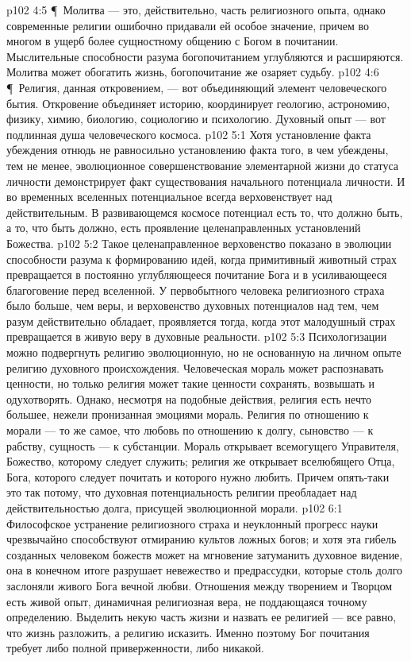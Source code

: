 \vs p102 4:5 \P\ Молитва --- это, действительно, часть религиозного опыта, однако современные религии ошибочно придавали ей особое значение, причем во многом в ущерб более сущностному общению с Богом в почитании. Мыслительные способности разума богопочитанием углубляются и расширяются. Молитва может обогатить жизнь, богопочитание же озаряет судьбу.
\vs p102 4:6 \P\ Религия, данная откровением, --- вот объединяющий элемент человеческого бытия. Откровение объединяет историю, координирует геологию, астрономию, физику, химию, биологию, социологию и психологию. Духовный опыт --- вот подлинная душа человеческого космоса.
\vs p102 5:1 Хотя установление факта убеждения отнюдь не равносильно установлению факта того, в чем убеждены, тем не менее, эволюционное совершенствование элементарной жизни до статуса личности демонстрирует факт существования начального потенциала личности. И во временных вселенных потенциальное всегда верховенствует над действительным. В развивающемся космосе потенциал есть то, что должно быть, а то, что быть должно, есть проявление целенаправленных установлений Божества.
\vs p102 5:2 Такое целенаправленное верховенство показано в эволюции способности разума к формированию идей, когда примитивный животный страх превращается в постоянно углубляющееся почитание Бога и в усиливающееся благоговение перед вселенной. У первобытного человека религиозного страха было больше, чем веры, и верховенство духовных потенциалов над тем, чем разум действительно обладает, проявляется тогда, когда этот малодушный страх превращается в живую веру в духовные реальности.
\vs p102 5:3 Психологизации можно подвергнуть религию эволюционную, но не основанную на личном опыте религию духовного происхождения. Человеческая мораль может распознавать ценности, но только религия может такие ценности сохранять, возвышать и одухотворять. Однако, несмотря на подобные действия, религия есть нечто большее, нежели пронизанная эмоциями мораль. Религия по отношению к морали --- то же самое, что любовь по отношению к долгу, сыновство --- к рабству, сущность --- к субстанции. Мораль открывает всемогущего Управителя, Божество, которому следует служить; религия же открывает вселюбящего Отца, Бога, которого следует почитать и которого нужно любить. Причем опять\hyp{}таки это так потому, что духовная потенциальность религии преобладает над действительностью долга, присущей эволюционной морали.
\vs p102 6:1 Философское устранение религиозного страха и неуклонный прогресс науки чрезвычайно способствуют отмиранию культов ложных богов; и хотя эта гибель созданных человеком божеств может на мгновение затуманить духовное видение, она в конечном итоге разрушает невежество и предрассудки, которые столь долго заслоняли живого Бога вечной любви. Отношения между творением и Творцом есть живой опыт, динамичная религиозная вера, не поддающаяся точному определению. Выделить некую часть жизни и назвать ее религией --- все равно, что жизнь разложить, а религию исказить. Именно поэтому Бог почитания требует либо полной приверженности, либо никакой.
